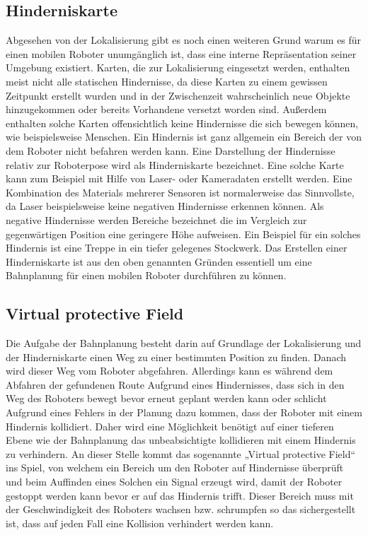 \subsection{Hinderniskarte}
Abgesehen von der Lokalisierung gibt es noch einen weiteren Grund warum es für einen mobilen Roboter unumgänglich ist,
 dass eine interne Repräsentation seiner Umgebung existiert. Karten, die zur Lokalisierung eingesetzt werden,
 enthalten meist nicht alle statischen Hindernisse, da diese Karten zu einem gewissen Zeitpunkt erstellt wurden und
 in der Zwischenzeit wahrscheinlich neue Objekte hinzugekommen oder bereits Vorhandene versetzt worden sind.
 Außerdem enthalten solche Karten offensichtlich keine Hindernisse die sich bewegen können, wie beispielsweise Menschen.
 Ein Hindernis ist ganz allgemein ein Bereich der von dem Roboter nicht befahren werden kann. Eine Darstellung der Hindernisse
 relativ zur Roboterpose wird als Hinderniskarte bezeichnet. Eine solche Karte
 kann zum Beispiel mit Hilfe von Laser- oder Kameradaten erstellt werden.
 Eine Kombination des Materials mehrerer Sensoren ist normalerweise das Sinnvollste,
 da Laser beispielsweise keine negativen Hindernisse erkennen können.
 Als negative Hindernisse werden Bereiche bezeichnet die im Vergleich zur
 gegenwärtigen Position eine geringere Höhe aufweisen.
 Ein Beispiel für ein solches Hindernis ist eine Treppe in ein tiefer gelegenes
 Stockwerk. Das Erstellen einer Hinderniskarte ist aus den oben genannten
 Gründen essentiell um eine Bahnplanung für einen mobilen Roboter
 durchführen zu können.
\subsection{Virtual protective Field}
Die Aufgabe der Bahnplanung besteht darin auf Grundlage der Lokalisierung und der Hinderniskarte einen Weg zu einer
 bestimmten Position zu finden. Danach wird dieser Weg vom Roboter abgefahren. Allerdings kann es während dem Abfahren der gefundenen
 Route Aufgrund eines Hindernisses, dass sich in den Weg des Roboters bewegt bevor erneut geplant werden kann oder
 schlicht Aufgrund eines Fehlers in der Planung dazu kommen, dass der Roboter mit einem Hindernis kollidiert.
 Daher wird eine Möglichkeit benötigt auf einer tieferen Ebene wie der Bahnplanung das unbeabsichtigte kollidieren mit einem Hindernis
 zu verhindern. An dieser Stelle kommt das sogenannte „Virtual protective Field“ ins Spiel, von welchem ein Bereich um den Roboter auf
 Hindernisse überprüft und beim Auffinden eines Solchen ein Signal erzeugt wird, damit der Roboter gestoppt werden kann bevor er
 auf das Hindernis trifft. Dieser Bereich muss mit der Geschwindigkeit des
 Roboters wachsen bzw. schrumpfen so das sichergestellt ist, dass auf jeden
 Fall eine Kollision verhindert werden kann.
